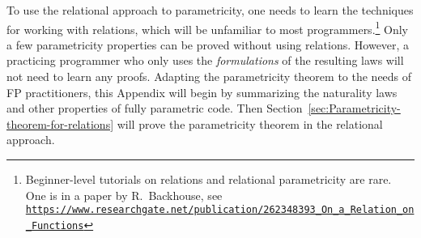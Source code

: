 To use the relational approach to parametricity, one needs to learn
the techniques for working with relations, which will be unfamiliar
to most programmers.\footnote{Beginner-level tutorials on relations and relational parametricity
are rare. One is in a paper by R.~Backhouse,
see \texttt{\href{https://www.researchgate.net/publication/262348393_On_a_Relation_on_Functions}{https://www.researchgate.net/publication/262348393\_On\_a\_Relation\_on\_Functions}}} Only a few parametricity properties can be proved without using relations.
However, a practicing programmer who only uses the \emph{formulations}
of the resulting laws will not need to learn any proofs. Adapting
the parametricity theorem to the needs of FP practitioners, this Appendix
will begin by summarizing the naturality laws and other properties
of fully parametric code. Then Section~\ref{sec:Parametricity-theorem-for-relations}
will prove the parametricity theorem in the relational approach.%
\begin{comment}
Section~\ref{sec:Commutativity-laws-for-type-constructors} proves
that fully parametric type constructors obey commutativity laws. Section~\ref{sec:Naturality-laws-for-fully-parametric-functions}
shows, without using relations, that fully parametric functions satisfy
dinaturality laws (a generalization of naturality laws to arbitrary
type signatures). An important consequence, proved in Section~\ref{sec:Uniqueness-of-functor-and-contrafunctor},
is that the code implementing the functor and contrafunctor typeclasses
is unique. Finally, Section~\ref{sec:Parametricity-theorem-for-relations}
explains the relational approach to parametricity and proves the relational
parametricity theorem. 

Additional literature:

{[}1{]}: Girard, J.-Y.; Scedrov, A. \& Scott, P. J. Normal Forms and
Cut-Free Proofs as Natural Transformations. Logic From Computer Science,
Mathematical Science Research Institute Publications 21, Springer-Verlag,
1992, 217-241. http://citeseer.ist.psu.edu/viewdoc/summary?doi=10.1.1.41.811

{[}2{]}: Bainbridge, E. S.; Freyd, P. J.; Scedrov, A. \& Scott, P.
J. Functorial polymorphism. Theoretical computer science, Elsevier,
1990, 70, 35-64. https://core.ac.uk/display/82270459

{[}3{]}: De Lataillade, J. Dinatural Terms in System F. Logic in Computer
Science, 24th Annual IEEE Symposium, 267-276, 2009. https://www.irif.fr/\textasciitilde delatail/dinat.pdf

{[}4{]}: Pistone, P. On completeness and parametricity in the realizability
semantics of System F. https://arxiv.org/abs/1802.05143

{[}5{]}: https://libres.uncg.edu/ir/asu/f/Johann\_Patricia\_2014\_A\_Relationally\_Parametric\_Model\_Of\_Dependent\_Type\_Theory..pdf

See discussion here: https://cstheory.stackexchange.com/questions/42256/is-case-analysis-on-normal-forms-of-lambda-terms-sufficient-to-prove-parametrici
\end{comment}

